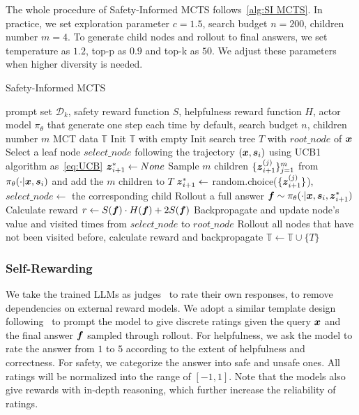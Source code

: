 The whole procedure of Safety-Informed MCTS follows~\cref{alg:SI MCTS}. In practice, we set exploration parameter $c=1.5$, search budget $n=200$, children number $m=4$. To generate child nodes and rollout to final answers, we set temperature as $1.2$, top-p as $0.9$ and top-k as $50$. We adjust these parameters when higher diversity is needed.



\begin{algorithm}[ht]
   \caption{Safety-Informed MCTS}
   \label{alg:SI MCTS}
\begin{algorithmic}
    prompt set $\mathcal{D}_k$, safety reward function $S$, helpfulness reward function $H$, actor model $\pi_\theta$ that generate one step each time by default, search budget $n$, children number $m$
    MCT data $\mathbb{T}$
   \STATE Init $\mathbb{T}$ with empty
        \STATE Init search tree $T$ with $root\_node$ of $\boldsymbol{x}$
            \STATE Select a leaf node $select\_node$ following the trajectory $(\boldsymbol{x},\boldsymbol{s}_i)$ using UCB1 algorithm as~\cref{eq:UCB}
            \STATE $\boldsymbol{z}_{i+1}^\ast \leftarrow None$
                    \STATE Sample $m$ children $\{\boldsymbol{z}_{i+1}^{(j)}\}_{j=1}^m$ from $\pi_\theta(\cdot|\boldsymbol{x}, \boldsymbol{s}_i)$ and add the $m$ children to $T$
                    \STATE $\boldsymbol{z}_{i+1}^\ast \leftarrow$ random.choice($\{\boldsymbol{z}_{i+1}^{(j)}\}$), $select\_node \leftarrow$ the corresponding child
                \ENDIF
            \ENDIF
            \STATE Rollout a full answer $\boldsymbol{f}\sim\pi_\theta(\cdot|\boldsymbol{x},\boldsymbol{s}_i, \boldsymbol{z}_{i+1}^\ast)$
            \STATE Calculate reward $r \leftarrow S(\boldsymbol{f}) \cdot H(\boldsymbol{f}) +2S(\boldsymbol{f})$
            \STATE Backpropagate and update node's value and visited times from $select\_node$ to $root\_node$
        \ENDFOR
        \STATE Rollout all nodes that have not been visited before, calculate reward and backpropagate
        \STATE $\mathbb{T}\leftarrow \mathbb{T}\cup\{T\}$
   \ENDFOR
\end{algorithmic}
\end{algorithm}

\subsubsection{Self-Rewarding} 
We take the trained LLMs as judges~\cite{zheng2023judging} to rate their own responses, to remove dependencies on external reward models. We adopt a similar template design following~\cite{yuanself} to prompt the model to give discrete ratings given the query $\boldsymbol{x}$ and the final answer $\boldsymbol{f}$ sampled through rollout. For helpfulness, we ask the model to rate the answer from $1$ to $5$ according to the extent of helpfulness and correctness. For safety, we categorize the answer into safe and unsafe ones. All ratings will be normalized into the range of $[-1,1]$. Note that the models also give rewards with in-depth reasoning, which further increase the reliability of ratings.

